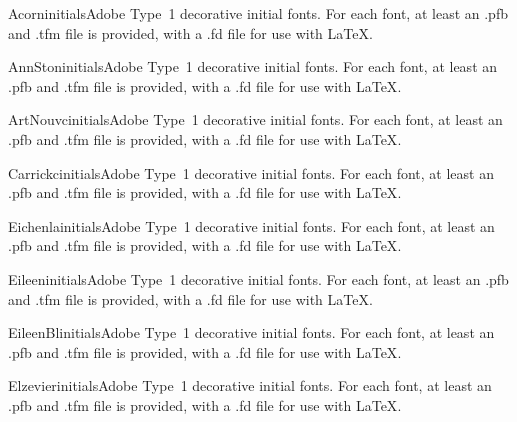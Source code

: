 \documentclass{ddltxtyp}
\begin{document}
\begin{package}{Acorn}{initials}{Adobe Type~1 decorative initial fonts.}
For each font, at least an .pfb and .tfm file is provided, with
a .fd file for use with {\LaTeX}.
\end{package}
\begin{package}{AnnSton}{initials}{Adobe Type~1 decorative initial fonts.}
For each font, at least an .pfb and .tfm file is provided, with
a .fd file for use with {\LaTeX}.
\end{package}
\begin{package}{ArtNouvc}{initials}{Adobe Type~1 decorative initial fonts.}
For each font, at least an .pfb and .tfm file is provided, with
a .fd file for use with {\LaTeX}.
\end{package}
\begin{package}{Carrickc}{initials}{Adobe Type~1 decorative initial fonts.}
For each font, at least an .pfb and .tfm file is provided, with
a .fd file for use with {\LaTeX}.
\end{package}
\begin{package}{Eichenla}{initials}{Adobe Type~1 decorative initial fonts.}
For each font, at least an .pfb and .tfm file is provided, with
a .fd file for use with {\LaTeX}.
\end{package}
\begin{package}{Eileen}{initials}{Adobe Type~1 decorative initial fonts.}
For each font, at least an .pfb and .tfm file is provided, with
a .fd file for use with {\LaTeX}.
\end{package}
\begin{package}{EileenBl}{initials}{Adobe Type~1 decorative initial fonts.}
For each font, at least an .pfb and .tfm file is provided, with
a .fd file for use with {\LaTeX}.
\end{package}
\begin{package}{Elzevier}{initials}{Adobe Type~1 decorative initial fonts.}
For each font, at least an .pfb and .tfm file is provided, with
a .fd file for use with {\LaTeX}.
\end{package}
\end{document}
